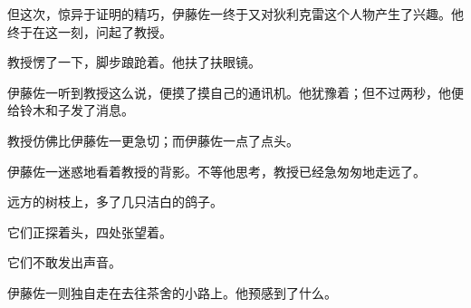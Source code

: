 但这次，惊异于证明的精巧，伊藤佐一终于又对狄利克雷这个人物产生了兴趣。他终于在这一刻，问起了教授。


教授愣了一下，脚步踉跄着。他扶了扶眼镜。




伊藤佐一听到教授这么说，便摸了摸自己的通讯机。他犹豫着；但不过两秒，他便给铃木和子发了消息。



教授仿佛比伊藤佐一更急切；而伊藤佐一点了点头。


伊藤佐一迷惑地看着教授的背影。不等他思考，教授已经急匆匆地走远了。

远方的树枝上，多了几只洁白的鸽子。

它们正探着头，四处张望着。

它们不敢发出声音。

伊藤佐一则独自走在去往茶舍的小路上。他预感到了什么。





